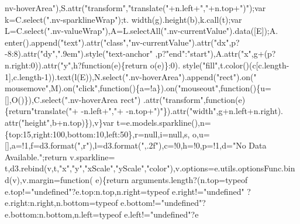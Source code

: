 \begin{DoxyCode}
{      nv-hoverArea"}),S.attr(\textcolor{stringliteral}{"transform"},\textcolor{stringliteral}{"translate("}+n.left+\textcolor{stringliteral}{","}+n.top+\textcolor{stringliteral}{")"});var k=C.select(\textcolor{stringliteral}{".nv-sparklineWrap"});t.
      width(g).height(b),k.call(t);var L=C.select(\textcolor{stringliteral}{".nv-valueWrap"}),A=L.selectAll(\textcolor{stringliteral}{".nv-currentValue"}).data([E]);A.
      enter().append(\textcolor{stringliteral}{"text"}).attr(\textcolor{stringliteral}{"class"},\textcolor{stringliteral}{"nv-currentValue"}).attr(\textcolor{stringliteral}{"dx"},p?-8:8).attr(\textcolor{stringliteral}{"dy"},\textcolor{stringliteral}{".9em"}).style(\textcolor{stringliteral}{"text-anchor"}
      ,p?\textcolor{stringliteral}{"end"}:\textcolor{stringliteral}{"start"}),A.attr(\textcolor{stringliteral}{"x"},g+(p?n.right:0)).attr(\textcolor{stringliteral}{"y"},h?\textcolor{keyword}{function}(e)\{\textcolor{keywordflow}{return} o(e)\}:0).
      style(\textcolor{stringliteral}{"fill"},t.color()(c[c.length-1],c.length-1)).text(l(E)),N.select(\textcolor{stringliteral}{".nv-hoverArea"}).append(\textcolor{stringliteral}{"rect"}).on(\textcolor{stringliteral}{"
      mousemove"},M).on(\textcolor{stringliteral}{"click"},\textcolor{keyword}{function}()\{a=!a\}).on(\textcolor{stringliteral}{"mouseout"},\textcolor{keyword}{function}()\{u=[],O()\}),C.select(\textcolor{stringliteral}{".nv-hoverArea rect"})
      .attr(\textcolor{stringliteral}{"transform"},\textcolor{keyword}{function}(e)\{\textcolor{keywordflow}{return}\textcolor{stringliteral}{"translate("}+ -n.left+\textcolor{stringliteral}{","}+ -n.top+\textcolor{stringliteral}{")"}\}).attr(\textcolor{stringliteral}{"width"},g+n.left+n.right).
      attr(\textcolor{stringliteral}{"height"},b+n.top)\}),v\}var t=e.models.sparkline(),n=\{top:15,right:100,bottom:10,left:50\},r=null,i=null,s,
      o,u=[],a=!1,f=d3.format(\textcolor{stringliteral}{",r"}),l=d3.format(\textcolor{stringliteral}{",.2f"}),c=!0,h=!0,p=!1,d=\textcolor{stringliteral}{"No Data Available."};\textcolor{keywordflow}{return} v.sparkline=
      t,d3.rebind(v,t,\textcolor{stringliteral}{"x"},\textcolor{stringliteral}{"y"},\textcolor{stringliteral}{"xScale"},\textcolor{stringliteral}{"yScale"},\textcolor{stringliteral}{"color"}),v.options=e.utils.optionsFunc.bind(v),v.margin=\textcolor{keyword}{function}(
      e)\{\textcolor{keywordflow}{return} arguments.length?(n.top=typeof e.top!=\textcolor{stringliteral}{"undefined"}?e.top:n.top,n.right=typeof e.right!=\textcolor{stringliteral}{"undefined"}
      ?e.right:n.right,n.bottom=typeof e.bottom!=\textcolor{stringliteral}{"undefined"}?e.bottom:n.bottom,n.left=typeof e.left!=\textcolor{stringliteral}{"undefined"}?e

\end{DoxyCode}
